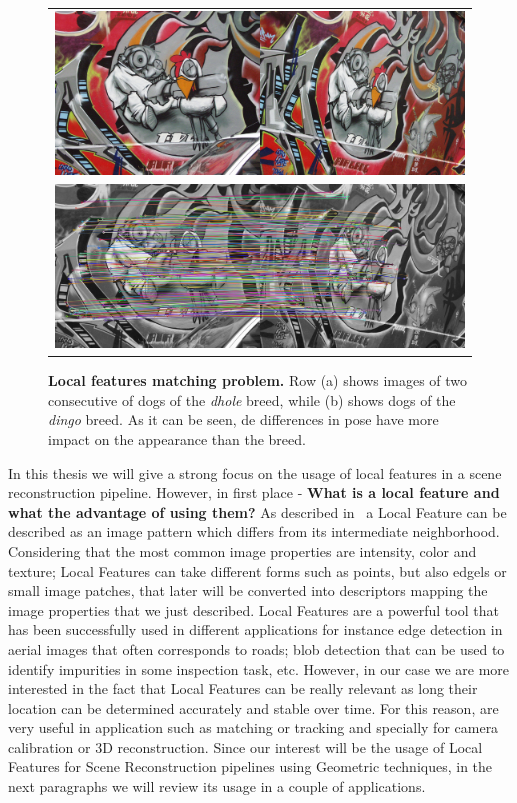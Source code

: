 \begin{figure}[t!]
	\centering
    \begin{tabular}{c}
    	\includegraphics[width=\textwidth]{main/introduction/images/local_features_graffiti.png} \\
    	\includegraphics[width=\textwidth]{main/introduction/images/local_features_graffiti_matching.png}
    \end{tabular}
	\caption[Local features matching problem]{\textbf{Local features matching problem.} Row (a) shows images of two consecutive of dogs of the \emph{dhole} breed, while (b) shows dogs of the \emph{dingo} breed. As it can be seen, de differences in pose have more impact on the appearance than the breed. }
	\label{fig:fine_grained_dogs}
\end{figure}

In this thesis we will give a strong focus on the usage of local features in a scene reconstruction pipeline. However, in first place - \textbf{What is a local feature and what the advantage of using them?} As described in~\citep{tuytelaars2008local} a Local Feature can be described as an image pattern which differs from its intermediate neighborhood. Considering that the most common image properties are intensity, color and texture; Local Features can take different forms such as points, but also edgels or small image patches, that later will be converted into descriptors mapping the image properties that we just described. Local Features are a powerful tool that has been successfully used in different applications for instance edge detection in aerial images that often corresponds to roads; blob detection that can be used to identify impurities in some inspection task, etc. However, in our case we are more interested in the fact that Local Features can be really relevant as long their location can be determined accurately and stable over time. For this reason, are very useful in application such as matching or tracking and specially for camera calibration or 3D reconstruction. Since our interest will be the usage of Local Features for Scene Reconstruction pipelines using Geometric techniques, in the next paragraphs we will review its usage in a couple of applications.


